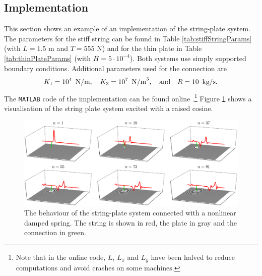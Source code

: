 \subsection{Implementation}\label{sec:implementationStringPlate}
This section shows an example of an implementation of the string-plate system. The parameters for the stiff string can be found in Table \ref{tab:stiffStringParams} (with $L = 1.5$ m and $T = 555$ N) and for the thin plate in Table \ref{tab:thinPlateParams} (with $H=5\cdot10^{-4}$). Both systems use simply supported boundary conditions. Additional parameters used for the connection are
\begin{equation*}
    K_1 = 10^4\ \,\text{N/m}, \quad K_3 = 10^7\ \,\text{N/m}^3, \qaq R = 10\ \,\text{kg/s}.
\end{equation*}
The \texttt{MATLAB} code of the implementation can be found online \cite{stringPlateGist}.\footnote{Note that in the online code, $L$, $L_x$ and $L_y$ have been halved to reduce computations and avoid crashes on some machines.}  Figure \ref{fig:stringPlate} shows a visualisation of the string plate system excited with a raised cosine. 
\begin{figure}[h]
    \includegraphics[width=\textwidth]{figures/interactions/stringPlate.eps}
    \caption{The behaviour of the string-plate system connected with a nonlinear damped spring. The string is shown in red, the plate in gray and the connection in green. \label{fig:stringPlate}}
\end{figure}


